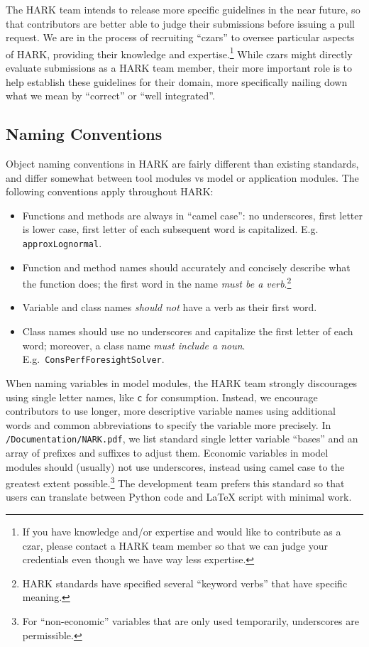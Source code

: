 \documentclass[12pt,titlepage,letterpaper]{econtex}
\begin{document}
The HARK team intends to release more specific guidelines in the near future, so that contributors are better able to judge their submissions before issuing a pull request.  We are in the process of recruiting ``czars'' to oversee particular aspects of HARK, providing their knowledge and expertise.\footnote{If you have knowledge and/or expertise and would like to contribute as a czar, please contact a HARK team member so that we can judge your credentials even though we have way less expertise.}  While czars might directly evaluate submissions as a HARK team member, their more important role is to help establish these guidelines for their domain, more specifically nailing down what we mean by ``correct'' or ``well integrated''.

\subsection{Naming Conventions}\label{sec:NamingConventions}

Object naming conventions in HARK are fairly different than existing standards, and differ somewhat between tool modules vs model or application modules.  The following conventions apply throughout HARK:
\begin{itemize}
\item Functions and methods are always in ``camel case'': no underscores, first letter is lower case, first letter of each subsequent word is capitalized.  E.g. \texttt{approxLognormal}.

\item Function and method names should accurately and concisely describe what the function does; the first word in the name \textit{must be a verb}.\footnote{HARK standards have specified several ``keyword verbs'' that have specific meaning.}

\item Variable and class names \textit{should not} have a verb as their first word.

\item Class names should use no underscores and capitalize the first letter of each word; moreover, a class name \textit{must include a noun}.  E.g.\ \texttt{ConsPerfForesightSolver}.
\end{itemize}

When naming variables in model modules, the HARK team strongly discourages using single letter names, like \texttt{c} for consumption.  Instead, we encourage contributors to use longer, more descriptive variable names using additional words and common abbreviations to specify the variable more precisely.  In \texttt{/Documentation/NARK.pdf}, we list standard single letter variable ``bases'' and an array of prefixes and suffixes to adjust them.  Economic variables in model modules should (usually) not use underscores, instead using camel case to the greatest extent possible.\footnote{For ``non-economic'' variables that are only used temporarily, underscores are permissible.}  The development team prefers this standard so that users can translate between Python code and LaTeX script with minimal work.
\end{document}
